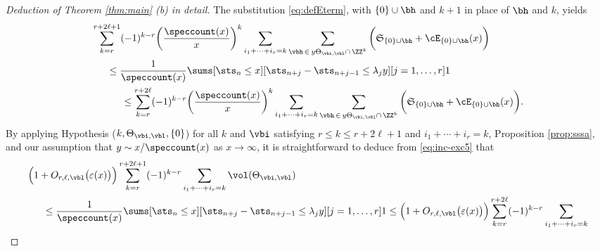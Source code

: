\documentclass[12pt, reqno, twoside, letterpaper]{amsart}
\begin{document}
\begin{nixnix}
\begin{proof}[Deduction of Theorem \ref{thm:main} (b) in detail]
The substitution \eqref{eq:defEterm}, with $\{0\} \cup \bh$ and 
$k + 1$ in place of $\bh$ and $k$, yields 
\begin{align}
 \begin{split}
  \label{eq:inc-exc5}
 & 
   \sum_{k = r}^{r + 2\ell + 1}
    (-1)^{k - r}
     \bigg(\frac{\speccount(x)}{x}\bigg)^k
     \sum_{i_1 + \cdots + i_r = k}
      \sum_{\vbh \, \in \, y\Theta_{\vbi,\vbl} \cap \, \ZZ^k}
       \bigg(\mathfrak{S}_{\{0\} \cup \bh} + \cE_{\{0\} \cup \bh}(x)\bigg)
 \\
 & \hspace{15pt} 
  \le 
   \frac{1}{\speccount(x)}
     \sums[\sts_n \le x]
          [\sts_{n + j} - \sts_{n + j - 1} \le \lambda_j y]
          [j = 1,\ldots,r] 1    
 \\
 & \hspace{30pt}
   \le 
    \sum_{k = r}^{r + 2\ell}
     (-1)^{k - r}
      \bigg(\frac{\speccount(x)}{x}\bigg)^k
       \sum_{i_1 + \cdots + i_r = k}
        \sum_{\vbh \, \in \, y\Theta_{\vbi,\vbl} \cap \, \ZZ^k}
         \bigg(\mathfrak{S}_{\{0\} \cup \bh} + \cE_{\{0\} \cup \bh}(x)\bigg).
  \end{split}            
\end{align}
% 
By applying Hypothesis ($k,\Theta_{\vbi,\vbl},\{0\}$) for all 
$k$ and $\vbi$ satisfying $r \le k \le r + 2\ell + 1$ and  
$i_1 + \cdots + i_r = k$, Proposition \ref{prop:sssa}, and our 
assumption that $y \sim x/\speccount(x)$ as $x \to \infty$, it is 
straightforward to deduce from \eqref{eq:inc-exc5} that 
\begin{align*}
 & 
   \Big(1 + O_{r,\ell,\vbl}\big(\varepsilon(x)\big)\Big)
    \sum_{k = r}^{r + 2\ell + 1}
     (-1)^{k - r}
      \sum_{i_1 + \cdots + i_r = k}
       \vol(\Theta_{\vbi,\vbl})
 \\
 &  \hspace{15pt} 
      \le 
       \frac{1}{\speccount(x)}
          \sums[\sts_n \le x]
               [\sts_{n + j} - \sts_{n + j - 1} \le \lambda_j y]
               [j = 1,\ldots,r] 1
         \le 
          \Big(1 + O_{r,\ell,\vbl}\big(\varepsilon(x)\big)\Big) 
           \sum_{k = r}^{r + 2\ell}
           (-1)^{k - r}
            \sum_{i_1 + \cdots + i_r = k}

\end{align*}
\end{proof}
\end{nixnix}
\end{document}

